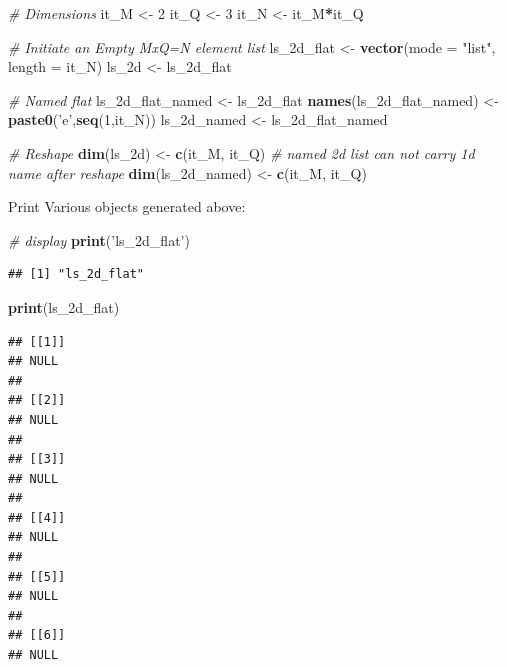 \documentclass[
]{book}
\newenvironment{Shaded}{\begin{snugshade}}{\end{snugshade}}
\newcommand{\CommentTok}[1]{\textcolor[rgb]{0.56,0.35,0.01}{\textit{#1}}}
\newcommand{\DataTypeTok}[1]{\textcolor[rgb]{0.13,0.29,0.53}{#1}}
\newcommand{\DecValTok}[1]{\textcolor[rgb]{0.00,0.00,0.81}{#1}}
\newcommand{\KeywordTok}[1]{\textcolor[rgb]{0.13,0.29,0.53}{\textbf{#1}}}
\newcommand{\NormalTok}[1]{#1}
\newcommand{\OperatorTok}[1]{\textcolor[rgb]{0.81,0.36,0.00}{\textbf{#1}}}
\newcommand{\StringTok}[1]{\textcolor[rgb]{0.31,0.60,0.02}{#1}}
\begin{document}
\begin{Shaded}
\begin{Highlighting}[]
\CommentTok{# Dimensions}
\NormalTok{it_M <-}\StringTok{ }\DecValTok{2}
\NormalTok{it_Q <-}\StringTok{ }\DecValTok{3}
\NormalTok{it_N <-}\StringTok{ }\NormalTok{it_M}\OperatorTok{*}\NormalTok{it_Q}

\CommentTok{# Initiate an Empty MxQ=N element list}
\NormalTok{ls_2d_flat <-}\StringTok{ }\KeywordTok{vector}\NormalTok{(}\DataTypeTok{mode =} \StringTok{"list"}\NormalTok{, }\DataTypeTok{length =}\NormalTok{ it_N)}
\NormalTok{ls_2d <-}\StringTok{ }\NormalTok{ls_2d_flat}

\CommentTok{# Named flat}
\NormalTok{ls_2d_flat_named <-}\StringTok{ }\NormalTok{ls_2d_flat}
\KeywordTok{names}\NormalTok{(ls_2d_flat_named) <-}\StringTok{ }\KeywordTok{paste0}\NormalTok{(}\StringTok{'e'}\NormalTok{,}\KeywordTok{seq}\NormalTok{(}\DecValTok{1}\NormalTok{,it_N))}
\NormalTok{ls_2d_named <-}\StringTok{ }\NormalTok{ls_2d_flat_named}

\CommentTok{# Reshape}
\KeywordTok{dim}\NormalTok{(ls_2d) <-}\StringTok{ }\KeywordTok{c}\NormalTok{(it_M, it_Q)}
\CommentTok{# named 2d list can not carry 1d name after reshape}
\KeywordTok{dim}\NormalTok{(ls_2d_named) <-}\StringTok{ }\KeywordTok{c}\NormalTok{(it_M, it_Q)}
\end{Highlighting}
\end{Shaded}

Print Various objects generated above:

\begin{Shaded}
\begin{Highlighting}[]
\CommentTok{# display}
\KeywordTok{print}\NormalTok{(}\StringTok{'ls_2d_flat'}\NormalTok{)}
\end{Highlighting}
\end{Shaded}

\begin{verbatim}
## [1] "ls_2d_flat"
\end{verbatim}

\begin{Shaded}
\begin{Highlighting}[]
\KeywordTok{print}\NormalTok{(ls_2d_flat)}
\end{Highlighting}
\end{Shaded}

\begin{verbatim}
## [[1]]
## NULL
## 
## [[2]]
## NULL
## 
## [[3]]
## NULL
## 
## [[4]]
## NULL
## 
## [[5]]
## NULL
## 
## [[6]]
## NULL
\end{verbatim}
\end{document}
